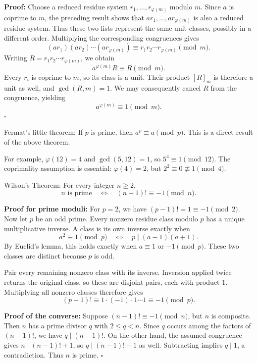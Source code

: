 \documentclass[a4paper,11pt,abstracton]{scrartcl}
\theoremstyle{dotlessP}
\theoremstyle{dotlessS}
\theoremstyle{remark}
\theoremstyle{definition}
\begin{document}
\textbf{Proof:}
Choose a reduced residue system $r_1,\ldots,r_{\varphi(m)}$ modulo $m$.
Since $a$ is coprime to $m$, the preceding result shows that
$ar_1,\ldots,ar_{\varphi(m)}$ is also a reduced residue system.
Thus these two lists represent the same unit classes, possibly in a
different order. Multiplying the corresponding congruences gives
\[
    (ar_1)(ar_2)\cdots(ar_{\varphi(m)})
    \equiv r_1r_2\cdots r_{\varphi(m)}\pmod m.
\]
Writing $R=r_1r_2\cdots r_{\varphi(m)}$, we obtain
\[
    a^{\varphi(m)}R\equiv R\pmod m.
\]
Every $r_i$ is coprime to $m$, so its class is a unit. Their product
$[R]_m$ is therefore a unit as well, and $\gcd(R,m)=1$.
We may consequently cancel $R$ from the congruence, yielding
\[
    a^{\varphi(m)}\equiv1\pmod m.
\]
\hfill$\square$


\begin{mainbox}{Fermat's little theorem:}
If $p$ is prime, then $a^p\equiv a\pmod p$. This is a direct result of the above theorem.
\end{mainbox}


\begin{example_box}
For example, $\varphi(12)=4$ and $\gcd(5,12)=1$, so
$5^4\equiv1\pmod{12}$. The coprimality assumption is essential:
$\varphi(4)=2$, but $2^2\equiv0\not\equiv1\pmod4$.
\end{example_box}

\begin{mainbox}{Wilson's Theorem:}
For every integer $n\geq2$,
\[
    \boxed{n\text{ is prime}\quad\Longleftrightarrow\quad
           (n-1)!\equiv-1\pmod n.}
\]
\end{mainbox}

\textbf{Proof for prime moduli:}
For $p=2$, we have $(p-1)!=1\equiv-1\pmod2$.
Now let $p$ be an odd prime. Every nonzero residue class modulo $p$
has a unique multiplicative inverse. A class is its own inverse
exactly when
\[
    a^2\equiv1\pmod p
    \quad\Longleftrightarrow\quad p\mid(a-1)(a+1).
\]
By Euclid's lemma, this holds exactly when $a\equiv1$ or $-1\pmod p$.
These two classes are distinct because $p$ is odd.

Pair every remaining nonzero class with its inverse. Inversion applied
twice returns the original class, so these are disjoint pairs, each
with product $1$. Multiplying all nonzero classes therefore gives
\[
    (p-1)!\equiv1\cdot(-1)\cdot1\cdots1\equiv-1\pmod p.
\]


\textbf{Proof of the converse:}
Suppose $(n-1)!\equiv-1\pmod n$, but $n$ is composite.
Then $n$ has a prime divisor $q$ with $2\leq q<n$.
Since $q$ occurs among the factors of $(n-1)!$, we have $q\mid(n-1)!$.
On the other hand, the assumed congruence gives $n\mid(n-1)!+1$,
so $q\mid(n-1)!+1$ as well. Subtracting implies $q\mid1$, a contradiction.
Thus $n$ is prime.
\hfill$\square$
\end{document}
